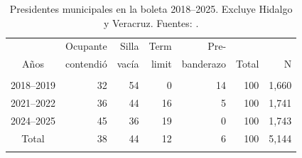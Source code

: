 \documentclass[letter,12pt]{article}
\begin{document}
\begin{table}
  \centering
  \begin{tabular}{crrrrrr}
               & Ocupante          & Silla       & Term       & Pre-          &        &      \\ [-0.4ex]
    Años       & contendió         & vacía       & limit      & banderazo     & Total &    N \\ [1ex] \hline \\ [-1.8ex]
    2018--2019 &                32 &          54 &          0 &            14 &   100 & 1,660 \\
    2021--2022 &                36 &          44 &         16 &             5 &   100 & 1,741 \\
    2024--2025 &                45 &          36 &         19 &             0 &   100 & 1,743 \\ 
    Total      &                38 &          44 &         12 &             6 &   100 & 5,144 \\
    \\ [-2ex] \hline
  \end{tabular}
  \caption{Presidentes municipales en la boleta 2018--2025. Excluye Hidalgo y Veracruz. Fuentes: \citet{magar.el.dataset.2026}.}\label{T:incballot}
\end{table}
\end{document}
